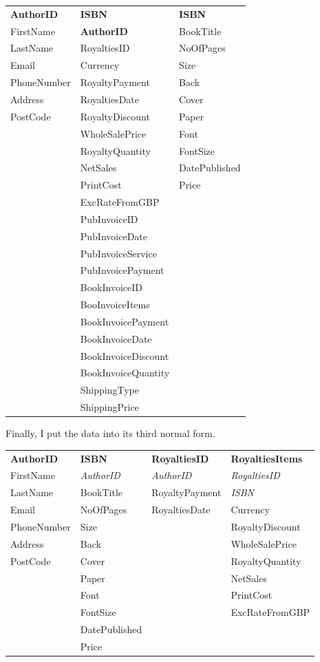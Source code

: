 \begin{tabular}{|p{2.5cm}|p{3.5cm}|p{2.5cm}|}
    \hline
    \textbf{AuthorID} & \textbf{ISBN} & \textbf{ISBN} \\
    FirstName & \textbf{AuthorID} & BookTitle \\
    LastName & RoyaltiesID & NoOfPages \\
    Email  & Currency & Size \\
    PhoneNumber & RoyaltyPayment & Back \\
    Address & RoyaltiesDate & Cover \\
    PostCode & RoyaltyDiscount & Paper \\
    & WholeSalePrice & Font \\
    & RoyaltyQuantity & FontSize \\
    & NetSales & DatePublished \\
    & PrintCost & Price \\
    & ExcRateFromGBP & \\
    & PubInvoiceID & \\
    & PubInvoiceDate & \\
    & PubInvoiceService & \\
    & PubInvoicePayment & \\
    & BookInvoiceID & \\
    & BooInvoiceItems & \\
    & BookInvoicePayment & \\
    & BookInvoiceDate & \\
    & BookInvoiceDiscount & \\
    & BookInvoiceQuantity & \\
    & ShippingType & \\
    & ShippingPrice & \\
    \hline
\end{tabular}

\newpage
Finally, I put the data into its third normal form.

\begin{tabular}{|p{2.5cm}|p{2.5cm}|p{2.5cm}|p{3cm}|}
    \hline
    \textbf{AuthorID} & \textbf{ISBN} & \textbf{RoyaltiesID} & \textbf{RoyaltiesItems} \\
    FirstName & \emph{AuthorID} & \emph{AuthorID} & \emph{RoyaltiesID} \\
    LastName & BookTitle & RoyaltyPayment & \emph{ISBN}  \\
    Email & NoOfPages & RoyaltiesDate & Currency  \\
    PhoneNumber & Size & & RoyaltyDiscount  \\
    Address & Back & & WholeSalePrice \\
    PostCode & Cover & & RoyaltyQuantity  \\
    & Paper & & NetSales \\
    & Font & & PrintCost \\
    & FontSize & & ExcRateFromGBP \\
    & DatePublished & & \\
    & Price & & \\
    \hline
\end{tabular}

